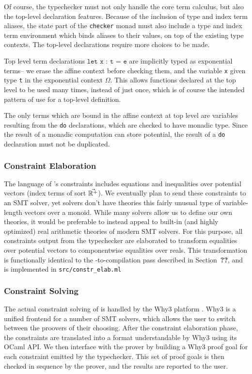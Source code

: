 Of course, the typechecker must not only handle the core term calculus, but also the top-level declaration features. Because of the inclusion of type and index term aliases, the state part of the \texttt{checker} monad must also include a type and index term environment which binds aliases to their values, on top of the existing type contexts. The top-level declarations require more choices to be made. 

Top level term declarations $\texttt{let x : t = e}$ are implicitly typed as exponential terms-- we erase the affine context before checking them, and the variable \texttt{x} given type \texttt{t} in the exponential context $\Omega$. This allows functions declared at the top level to be used many times, instead of just once, which is of course the intended pattern of use for a top-level definition.

The only terms which are bound in the affine context at top level are variables resulting from the \texttt{do} declarations, which are checked to have monadic type. Since the result of a monadic computation can store potential, the result of a \texttt{do} declaration must not be duplicated.

\subsubsection{Constraint Elaboration}
The language of \dlambdaamor's constraints includes equations and inequalities over potential vectors (index terms of sort $\vec{\mathbb{R}^+}$). We eventually plan to send these constraints to an SMT solver, yet solvers don't have theories this fairly unusual type of variable-length vectors over a monoid. While many solvers allow us to define our own theories, it would be preferable to instead appeal to built-in (and highly optimized) real arithmetic theories of modern SMT solvers. For this purpose, all constraints output from the typechecker are elaborated to transform equalities over potential vectors to componentwise equalities over reals. This transformation is functionally identical to the \dlambdaamor-to-\lambdaamorminus compilation pass described in Section~\textbf{??}, and is implemented in \texttt{src/constr_elab.ml}

\subsubsection{Constraint Solving}
The actual constraint solving of \lambdaamorimpl is handled by the Why3 platform \citehere. Why3 is a unified frontend for a number of SMT solvers, which allows the user to switch between the proovers of their choosing. After the constraint elaboration phase, the constraints are translated into a format understandable by Why3 using its OCaml API. We then interface with the prover by building a Why3 proof goal for each constraint emitted by the typechecker. This set of proof goals is then checked in sequence by the prover, and the results are reported to the user.

